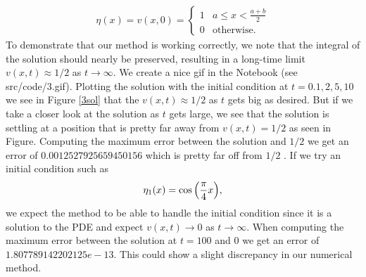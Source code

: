 \documentclass[12pt]{report}
\begin{document}
\begin{solution}
    \begin{align*}
        \eta(x) = v(x,0) = \begin{cases} 1 &a \leq x < \frac{a+b}{2} \\
        0 & \text{otherwise}.
        \end{cases}
    \end{align*}
    To demonstrate that our method is working correctly, we note that the integral of the solution should nearly be preserved, resulting in a long-time limit $v(x,t) \approx 1/2$ as $t \to \infty$. We create a nice gif in the Notebook (see src/code/3.gif). Plotting the solution with the initial condition at $t=0.1,2,5,10$ we see in Figure \ref{3sol} that the $v(x,t) \approx 1/2$ as $t$ gets big as desired. But if we take a closer look at the solution as $t$ gets large, we see that the solution is settling at a position that is pretty far away from $v(x,t) = 1/2$ as seen in Figure. Computing the maximum error between the solution and $1/2$ we get an error of $0.0012527925659450156$ which is pretty far off from $1/2$ . If we try an initial condition such as
    \[
        \eta_1(x) = \cos{\left(\frac{\pi}{4}x\right)},
    \]
    we expect the method to be able to handle the initial condition since it is a solution to the PDE and expect $v(x,t) \to 0$ as $t \to \infty$. When computing the maximum error between the solution at $t=100$ and $0$ we get an error of $1.807789142202125e-13$. This could show a slight discrepancy in our numerical method. 
    

\end{solution}
\end{document}
